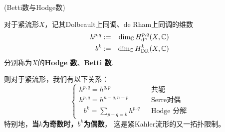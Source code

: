 
\begin{notation}(Betti数与Hodge数)

对于紧\Kahler 流形$X$，记其Dolbeault上同调、de Rham上同调的维数
\begin{eqnarray*}
  h^{p,q}&:=&\dim_{\mathbb{C}}H^{p,q}_{\mathrm{d}''}(X,\mathbb{C})\\
  b^{k}&:=&\dim_{\mathbb{C}}H^{k}_{\operatorname{DR}}(X,\mathbb{C})
\end{eqnarray*}
分别称为$X$的\textbf{Hodge 数}、\textbf{Betti 数}.
\end{notation}
则对于紧\Kahler 流形，我们有以下关系：
$$
  \left\{
    \begin{array}{lcl}
      h^{p,q}=h^{q,p}     && \text{共轭}           \\
      h^{p,q}=h^{n-q,n-p} && \text{Serre对偶}      \\
      \,\,\,\,
       b^k=\sum\limits_{p+q=k}h^{p,q}&&\text{Hodge 分解}
    \end{array}
  \right.
$$
特别地，\textbf{当$k$为奇数时，$b^k$为偶数}，
这是紧Kahler流形的又一拓扑限制。

